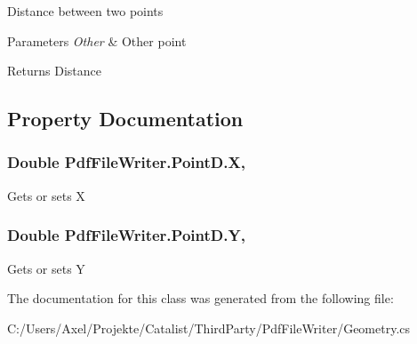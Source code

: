 Distance between two points 


\begin{DoxyParams}{Parameters}
{\em Other} & Other point\\
\hline
\end{DoxyParams}
\begin{DoxyReturn}{Returns}
Distance
\end{DoxyReturn}


\subsection{Property Documentation}
\subsubsection[{\texorpdfstring{X}{X}}]{\setlength{\rightskip}{0pt plus 5cm}Double Pdf\+File\+Writer.\+Point\+D.\+X\hspace{0.3cm}{\ttfamily [get]}, {\ttfamily [set]}}\hypertarget{class_pdf_file_writer_1_1_point_d_ab1ebb5c018dad567af9b941cf2bf9202}{}\label{class_pdf_file_writer_1_1_point_d_ab1ebb5c018dad567af9b941cf2bf9202}


Gets or sets X 

\subsubsection[{\texorpdfstring{Y}{Y}}]{\setlength{\rightskip}{0pt plus 5cm}Double Pdf\+File\+Writer.\+Point\+D.\+Y\hspace{0.3cm}{\ttfamily [get]}, {\ttfamily [set]}}\hypertarget{class_pdf_file_writer_1_1_point_d_acb5deebdc097dfdbdf2f7e7d8a143ca1}{}\label{class_pdf_file_writer_1_1_point_d_acb5deebdc097dfdbdf2f7e7d8a143ca1}


Gets or sets Y 



The documentation for this class was generated from the following file\+:\begin{DoxyCompactItemize}
\item 
C\+:/\+Users/\+Axel/\+Projekte/\+Catalist/\+Third\+Party/\+Pdf\+File\+Writer/Geometry.\+cs\end{DoxyCompactItemize}
